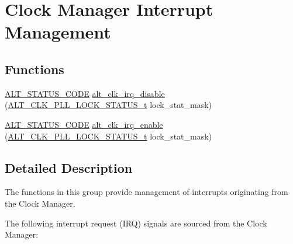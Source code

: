 \hypertarget{group__CLK__MGR__INT}{}\section{Clock Manager Interrupt Management}
\label{group__CLK__MGR__INT}
\subsection*{Functions}
\begin{DoxyCompactItemize}
\item 
\mbox{\hyperlink{hwlib_8h_abdb0d369f069723ca55d6c94bcaaaa12}{A\+L\+T\+\_\+\+S\+T\+A\+T\+U\+S\+\_\+\+C\+O\+DE}} \mbox{\hyperlink{group__CLK__MGR__INT_gaa37c8af166f14f2dc8c6712d9a4a4085}{alt\+\_\+clk\+\_\+irq\+\_\+disable}} (\mbox{\hyperlink{group__CLK__MGR__STATUS_ga62fbfc277685cad341f57ee0a252092c}{A\+L\+T\+\_\+\+C\+L\+K\+\_\+\+P\+L\+L\+\_\+\+L\+O\+C\+K\+\_\+\+S\+T\+A\+T\+U\+S\+\_\+t}} lock\+\_\+stat\+\_\+mask)
\item 
\mbox{\hyperlink{hwlib_8h_abdb0d369f069723ca55d6c94bcaaaa12}{A\+L\+T\+\_\+\+S\+T\+A\+T\+U\+S\+\_\+\+C\+O\+DE}} \mbox{\hyperlink{group__CLK__MGR__INT_ga8dac52ec4e5a203a697ce86a8a893fdd}{alt\+\_\+clk\+\_\+irq\+\_\+enable}} (\mbox{\hyperlink{group__CLK__MGR__STATUS_ga62fbfc277685cad341f57ee0a252092c}{A\+L\+T\+\_\+\+C\+L\+K\+\_\+\+P\+L\+L\+\_\+\+L\+O\+C\+K\+\_\+\+S\+T\+A\+T\+U\+S\+\_\+t}} lock\+\_\+stat\+\_\+mask)
\end{DoxyCompactItemize}


\subsection{Detailed Description}
The functions in this group provide management of interrupts originating from the Clock Manager.

The following interrupt request (I\+RQ) signals are sourced from the Clock Manager\+:



